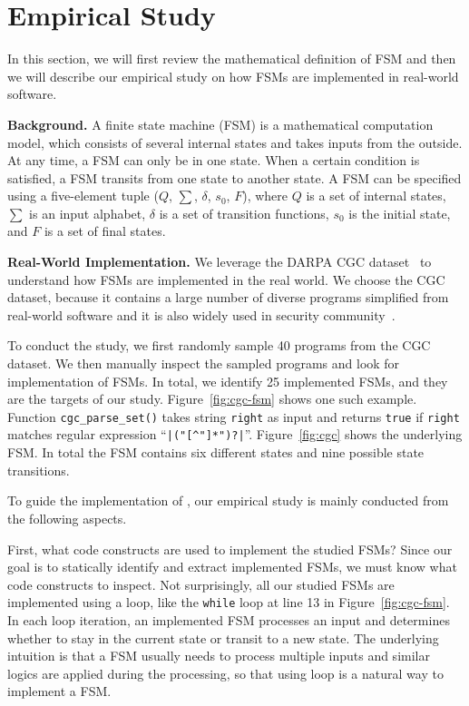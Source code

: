 \section{Empirical Study}
\label{sec:study}
In this section, we will first review the mathematical definition of FSM and then
we will describe our empirical study on how FSMs are implemented 
in real-world software. 

\noindent\textbf{Background.}
A finite state machine (FSM) is a mathematical computation model, 
which consists of several internal states and takes inputs from the outside.
At any time, a FSM can only be in one state. 
When a certain condition is satisfied, 
a FSM transits from one state to another state. 
A FSM can be specified using a five-element tuple ($Q$, $\sum$, $\delta$, $s_0$, $F$),
where $Q$ is a set of internal states, $\sum$ is an input alphabet, 
$\delta$ is a set of transition functions,
$s_0$ is the initial state, and $F$ is a set of final states. 

\noindent\textbf{Real-World Implementation.}
We leverage the DARPA CGC dataset~\cite{CGC} to 
understand how FSMs are implemented in the real world. 
We choose the CGC dataset, because it 
contains a large number of diverse programs simplified 
from real-world software and it 
is also widely used in security 
community~\cite{QSYM, Driller, VUzzer}. 


To conduct the study, we first randomly sample 
40 programs from the CGC dataset.
We then manually inspect the sampled programs and look for implementation of FSMs.
In total, we identify 25 implemented FSMs, 
and they are the targets of our study.
Figure~\ref{fig:cgc-fsm} shows one such example.
Function \texttt{cgc\_parse\_set()} takes string \texttt{right} 
as input and returns \texttt{true} if \texttt{right} matches 
regular expression ``\verb/|("[^"]*")?|/''. 
Figure~\ref{fig:cgc} shows the underlying FSM. 
In total the FSM contains six different states 
and nine possible state transitions. 





To guide the implementation of \Tool{}, our empirical study 
is mainly conducted from the following aspects.

First, what code constructs are used to implement the studied FSMs?
Since our goal is to statically identify and extract implemented FSMs, 
we must know what code constructs to inspect. 
Not surprisingly, all our studied FSMs are implemented using a loop, 
like the \texttt{while} loop at line 13 in Figure~\ref{fig:cgc-fsm}.  
In each loop iteration, an implemented FSM processes an input and 
determines whether to stay in the current state or transit to a new state. 
The underlying intuition is that a FSM usually needs to process 
multiple inputs and similar logics are applied during the processing, 
so that using loop is a natural way to implement a FSM. 

